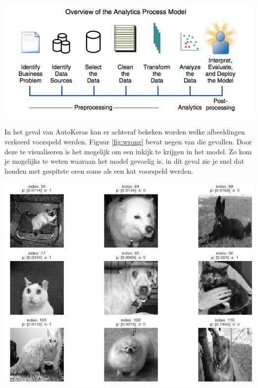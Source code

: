 \documentclass[a0,portrait]{a0poster}
\begin{document}
\begin{multicols}{2}
\begin{center}\vspace{1cm}
    \includegraphics[width=1.0\linewidth]{../bachproef/img/proces-model.png}
    \label{fig:proces}
\end{center}\vspace{1cm}

In het geval van AutoKeras kan er achteraf bekeken worden welke afbeeldingen verkeerd voorspeld werden. Figuur \ref{fig:wrong} bevat negen van die gevallen. Door deze te visualiseren is het mogelijk om een inkijk te krijgen in het model. Zo kom je mogelijks te weten waaraan het model gevoelig is, in dit geval zie je snel dat honden met gespitste oren soms als een kat voorspeld werden.

\begin{center}\vspace{1cm}
    \includegraphics[width=1\linewidth]{./figures/wrong.png}
    \label{fig:wrong}    
\end{center}


\end{multicols}
\end{document}
